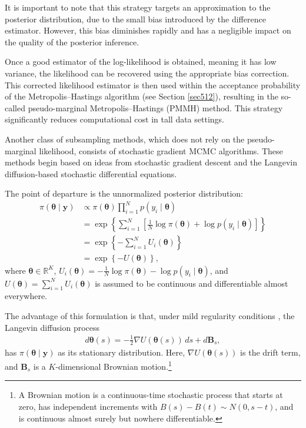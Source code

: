 It is important to note that this strategy targets an approximation to the posterior distribution, due to the small bias introduced by the difference estimator. However, this bias diminishes rapidly and has a negligible impact on the quality of the posterior inference.

Once a good estimator of the log-likelihood is obtained, meaning it has low variance, the likelihood can be recovered using the appropriate bias correction. This corrected likelihood estimator is then used within the acceptance probability of the Metropolis–Hastings algorithm (see Section \ref{sec512}), resulting in the so-called pseudo-marginal Metropolis–Hastings (PMMH) method. This strategy significantly reduces computational cost in tall data settings.

Another class of subsampling methods, which does not rely on the pseudo-marginal likelihood, consists of stochastic gradient MCMC algorithms. These methods begin based on ideas from stochastic gradient descent \cite{robbins1951stochastic} and the Langevin diffusion-based stochastic differential equations.

The point of departure is the unnormalized posterior distribution:
\begin{align*}
	\pi(\boldsymbol{\theta} \mid \mathbf{y}) &\propto \pi(\boldsymbol{\theta}) \prod_{i=1}^{N} p(y_i \mid \boldsymbol{\theta}) \\
	&= \exp\left\{ \sum_{i=1}^N \left[ \frac{1}{N} \log \pi(\boldsymbol{\theta}) + \log p(y_i \mid \boldsymbol{\theta}) \right] \right\} \\
	&= \exp\left\{ -\sum_{i=1}^N U_i(\boldsymbol{\theta}) \right\} \\
	&= \exp\left\{ -U(\boldsymbol{\theta}) \right\},
\end{align*}
where \( \boldsymbol{\theta} \in \mathbb{R}^K \), \( U_i(\boldsymbol{\theta}) = -\frac{1}{N} \log \pi(\boldsymbol{\theta}) - \log p(y_i \mid \boldsymbol{\theta}) \), and \( U(\boldsymbol{\theta}) = \sum_{i=1}^N U_i(\boldsymbol{\theta}) \) is assumed to be continuous and differentiable almost everywhere.  

The advantage of this formulation is that, under mild regularity conditions \cite{roberts1996exponential}, the Langevin diffusion process
\begin{align*}
	d\boldsymbol{\theta}(s) = -\frac{1}{2} \nabla U(\boldsymbol{\theta}(s))\,ds + d\mathbf{B}_s,
\end{align*}
has \( \pi(\boldsymbol{\theta} \mid \mathbf{y}) \) as its stationary distribution. Here, \( \nabla U(\boldsymbol{\theta}(s)) \) is the drift term, and \( \mathbf{B}_s \) is a \( K \)-dimensional Brownian motion.\footnote{A Brownian motion is a continuous-time stochastic process that starts at zero, has independent increments with \( B(s) - B(t) \sim {N}(0, s - t) \), and is continuous almost surely but nowhere differentiable.}

